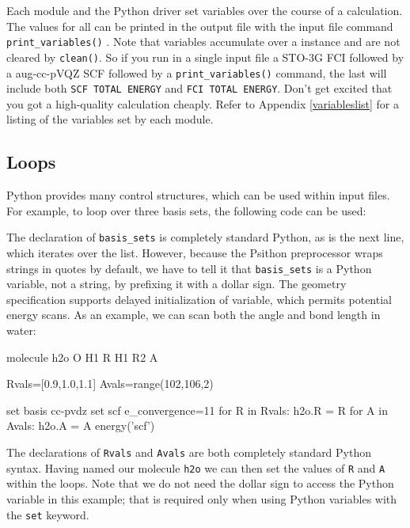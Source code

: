 Each module and the Python driver set \PSI variables over the course of
a calculation.  The values for all can be printed in the output file
with the input file command \texttt{print\_variables()} . Note that
\PSI variables accumulate over a \PSIfour instance and are not cleared by
\texttt{clean()}. So if you run in a single input file a STO-3G FCI
followed by a aug-cc-pVQZ SCF followed by a \texttt{print\_variables()}
command, the last will include both {\tt SCF TOTAL ENERGY} and
{\tt FCI TOTAL ENERGY}. Don't get excited that you got a high-quality calculation
cheaply. Refer to Appendix \ref{variableslist} for a listing of the
variables set by each module.

\subsection{Loops}
Python provides many control structures, which can be used within \PSIfour
input files. For example, to loop over three basis sets, the following code can
be used:
The declaration of {\tt basis\_sets} is completely standard Python, as is the next
line, which iterates over the list. However, because the Psithon preprocessor
wraps strings in quotes by default, we have to tell it that {\tt basis\_sets} is a
Python variable, not a string, by prefixing it with a dollar sign. The geometry
specification supports delayed initialization of variable, which permits
potential energy scans. As an example, we can scan both the angle and bond
length in water:
\begin{Snippet}
molecule h2o{
  O
  H1 R
  H1 R2 A
}

Rvals=[0.9,1.0,1.1]
Avals=range(102,106,2)

set basis cc-pvdz
set scf e_convergence=11
for R in Rvals:
    h2o.R = R
    for A in Avals:
        h2o.A = A
        energy('scf')
\end{Snippet}
The declarations of {\tt Rvals} and {\tt Avals} are both completely standard Python syntax.
Having named our molecule {\tt h2o} we can then set the values of {\tt R} and {\tt A} within
the loops. Note that we do not need the dollar sign to access the Python
variable in this example; that is required only when using Python variables
with the {\tt set} keyword.


